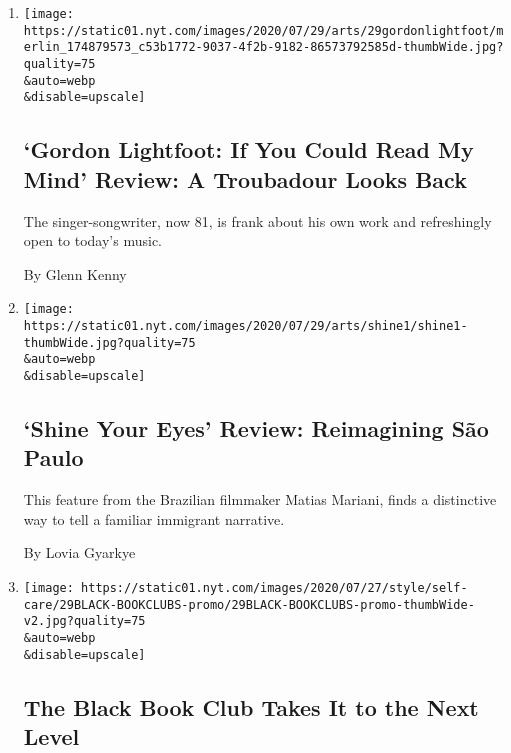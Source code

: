 \begin{enumerate}
\def\labelenumi{\arabic{enumi}.}
\item
  \href{/2020/07/29/movies/gordon-lightfoot-if-you-could-read-my-mind-review.html}{}

  \texttt{[image: https://static01.nyt.com/images/2020/07/29/arts/29gordonlightfoot/merlin\_174879573\_c53b1772-9037-4f2b-9182-86573792585d-thumbWide.jpg?quality=75\\\&auto=webp\\\&disable=upscale]}

  \hypertarget{gordon-lightfoot-if-you-could-read-my-mind-review-a-troubadour-looks-back}{%
  \subsection{`Gordon Lightfoot: If You Could Read My Mind' Review: A
  Troubadour Looks
  Back}\label{gordon-lightfoot-if-you-could-read-my-mind-review-a-troubadour-looks-back}}

  The singer-songwriter, now 81, is frank about his own work and
  refreshingly open to today's music.

  By Glenn Kenny
\item
  \href{/2020/07/29/movies/shine-your-eyes-review.html}{}

  \texttt{[image: https://static01.nyt.com/images/2020/07/29/arts/shine1/shine1-thumbWide.jpg?quality=75\\\&auto=webp\\\&disable=upscale]}

  \hypertarget{shine-your-eyes-review-reimagining-suxe3o-paulo}{%
  \subsection{`Shine Your Eyes' Review: Reimagining São
  Paulo}\label{shine-your-eyes-review-reimagining-suxe3o-paulo}}

  This feature from the Brazilian filmmaker Matias Mariani, finds a
  distinctive way to tell a familiar immigrant narrative.

  By Lovia Gyarkye
\item
  \href{/2020/07/29/style/self-care/black-book-clubs.html}{}

  \texttt{[image: https://static01.nyt.com/images/2020/07/27/style/self-care/29BLACK-BOOKCLUBS-promo/29BLACK-BOOKCLUBS-promo-thumbWide-v2.jpg?quality=75\\\&auto=webp\\\&disable=upscale]}

  \hypertarget{the-black-book-club-takes-it-to-the-next-level}{%
  \subsection{The Black Book Club Takes It to the Next
  Level}\label{the-black-book-club-takes-it-to-the-next-level}}


\end{enumerate}
